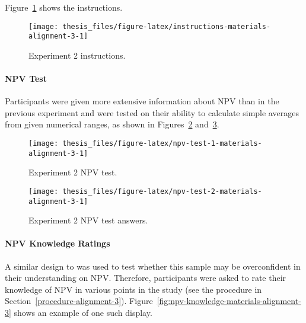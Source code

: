 \documentclass[a4paper, nobind]{templates/ociamthesis}
\theoremstyle{definition}
\theoremstyle{definition}
\theoremstyle{definition}
\theoremstyle{definition}
\theoremstyle{remark}
\begin{document}
Figure~\ref{fig:instructions-materials-alignment-3} shows the instructions.



\begin{figure}
\texttt{[image: thesis\_files/figure-latex/instructions-materials-alignment-3-1]} \caption{Experiment 2 instructions.}\label{fig:instructions-materials-alignment-3}
\end{figure}

\hypertarget{npv-test-materials-alignment-3}{%
\paragraph{NPV Test}\label{npv-test-materials-alignment-3}}

Participants were given more extensive information about NPV than in the
previous experiment and were tested on their ability to calculate simple
averages from given numerical ranges, as shown in
Figures~\ref{fig:npv-test-1-materials-alignment-3}
and~\ref{fig:npv-test-2-materials-alignment-3}.



\begin{figure}
\texttt{[image: thesis\_files/figure-latex/npv-test-1-materials-alignment-3-1]} \caption{Experiment 2 NPV test.}\label{fig:npv-test-1-materials-alignment-3}
\end{figure}



\begin{figure}
\texttt{[image: thesis\_files/figure-latex/npv-test-2-materials-alignment-3-1]} \caption{Experiment 2 NPV test answers.}\label{fig:npv-test-2-materials-alignment-3}
\end{figure}

\hypertarget{npv-knowledge-materials-alignment-3}{%
\paragraph{NPV Knowledge Ratings}\label{npv-knowledge-materials-alignment-3}}

A similar design to \textcite[Study~1]{long2018} was used to test whether this sample may
be overconfident in their understanding on NPV. Therefore, participants were
asked to rate their knowledge of NPV in various points in the study (see the
procedure in Section~\ref{procedure-alignment-3}).
Figure~\ref{fig:npv-knowledge-materials-alignment-3} shows an example of one
such display.
\end{document}
